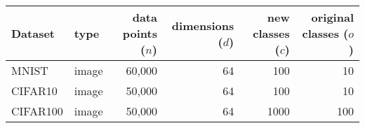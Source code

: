 \begin{tabular}{llrrrr}
    \toprule
    Dataset  & type & data points ($n$) & dimensions ($d$) & new classes ($c$) & original classes ($o$) \\
    \midrule
    MNIST    & image & 60,000 & 64 & 100 & 10\\
    CIFAR10  & image & 50,000 & 64 & 100 & 10\\
    CIFAR100 & image & 50,000 & 64 & 1000 & 100\\
    \bottomrule
\end{tabular}
\caption{
}

